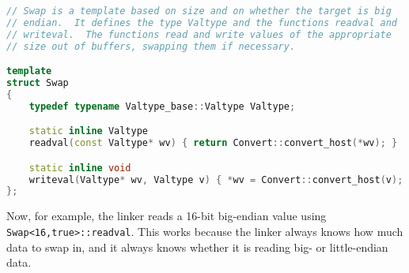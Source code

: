 \begin{lstlisting}[language=C++]
// Swap is a template based on size and on whether the target is big
// endian.  It defines the type Valtype and the functions readval and
// writeval.  The functions read and write values of the appropriate
// size out of buffers, swapping them if necessary.

template
struct Swap
{
    typedef typename Valtype_base::Valtype Valtype;

    static inline Valtype
    readval(const Valtype* wv) { return Convert::convert_host(*wv); }

    static inline void
    writeval(Valtype* wv, Valtype v) { *wv = Convert::convert_host(v); }
};
\end{lstlisting}

Now, for example, the linker reads a 16-bit big-endian value using
\texttt{Swap<16,true>::readval}.  This works because the linker always knows
how much data to swap in, and it always knows whether it is reading big- or
little-endian data.
